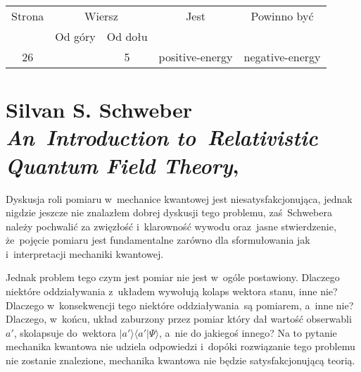 \documentclass[a4paper,11pt]{article}
\numberwithin{equation}{section}
\begin{document}


\begin{center}

  \begin{tabular}{|c|c|c|c|c|}
    \hline
    Strona & \multicolumn{2}{c|}{Wiersz} & Jest
                              & Powinno być \\ \cline{2-3}
    & Od góry & Od dołu & & \\
    \hline
    26  & &  5 & positive-energy & negative-energy \\
    \hline
  \end{tabular}

\end{center}

\VerSpaceTwo











\newpage

\section{ %
  Silvan S. Schweber \\
  \textit{An~Introduction to~Relativistic Quantum Field Theory},
  \cite{SchewberAnIntroductionToRelativisticQuantumFieldTheory2005}}


\vspace{0em}



\vspace{0em}


\noindent
{} Dyskusja roli pomiaru w~mechanice kwantowej jest
niesatysfakcjonująca, jednak nigdzie jeszcze nie znalazłem dobrej
dyskusji tego problemu, zaś~Schwebera należy pochwalić za zwięzłość
i~klarowność wywodu oraz~jasne stwierdzenie, że~pojęcie pomiaru jest
fundamentalne zarówno dla sformułowania jak i~interpretacji mechaniki
kwantowej.

Jednak problem tego czym jest pomiar nie jest w~ogóle postawiony.
Dlaczego niektóre oddziaływania z~układem wywołują kolaps wektora
stanu, inne nie? Dlaczego w~konsekwencji tego niektóre oddziaływania~są
pomiarem, a~inne nie? Dlaczego, w~końcu, układ zaburzony przez pomiar
który dał wartość obserwabli $a'$, skolapsuje do~wektora
$| a' \rangle \langle a' | \Psi \rangle$, a~nie do jakiegoś innego? Na to pytanie mechanika
kwantowa nie udziela odpowiedzi i~dopóki rozwiązanie tego problemu nie
zostanie znalezione, mechanika kwantowa nie będzie satysfakcjonującą teorią.
\end{document}
